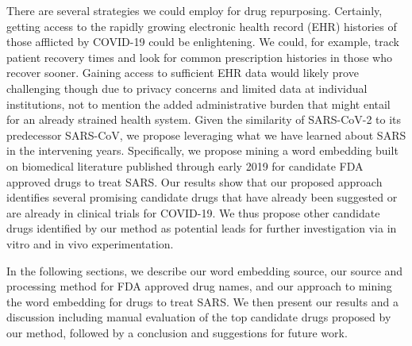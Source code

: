 \documentclass{article}
\begin{document}
There are several strategies we could employ for drug repurposing.
Certainly, getting access to the rapidly growing electronic health record (EHR) histories of those afflicted by COVID-19 could be enlightening.
We could, for example, track patient recovery times and look for common prescription histories in those who recover sooner.
Gaining access to sufficient EHR data would likely prove challenging though due to privacy concerns and limited data at individual institutions, not to mention the added administrative burden that might entail for an already strained health system.
Given the similarity of SARS-CoV-2 to its predecessor SARS-CoV\cite{wu2020genome}, we propose leveraging what we have learned about SARS in the intervening years.
Specifically, we propose mining a word embedding built on biomedical literature published through early 2019 for candidate FDA approved drugs to treat SARS.
Our results show that our proposed approach identifies several promising candidate drugs that have already been suggested or are already in clinical trials for COVID-19.
We thus propose other candidate drugs identified by our method as potential leads for further investigation via in vitro and in vivo experimentation.

In the following sections, we describe our word embedding source, our source and processing method for FDA approved drug names, and our approach to mining the word embedding for drugs to treat SARS.
We then present our results and a discussion including manual evaluation of the top candidate drugs proposed by our method, followed by a conclusion and suggestions for future work.
\end{document}
